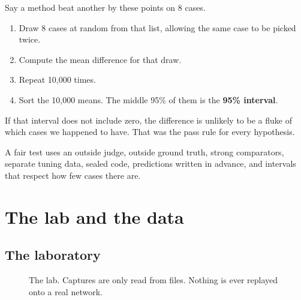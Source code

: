\begin{example}
Say a method beat another by these points on 8 cases.
\begin{enumerate}
\item Draw 8 cases at random from that list, allowing the same case to be picked twice.
\item Compute the mean difference for that draw.
\item Repeat 10,000 times.
\item Sort the 10,000 means. The middle 95\% of them is the \textbf{95\% interval}.
\end{enumerate}
If that interval does not include zero, the difference is unlikely to be a fluke of which cases we happened to have. That was the pass rule for every hypothesis.
\end{example}

\begin{recap}
A fair test uses an outside judge, outside ground truth, strong comparators, separate tuning data, sealed code, predictions written in advance, and intervals that respect how few cases there are.
\end{recap}

\chapter{The lab and the data}

\section{The laboratory}
\begin{figure}[H]
\centering
{}
\caption{The lab. Captures are only read from files. Nothing is ever replayed onto a real network.}
\end{figure}

